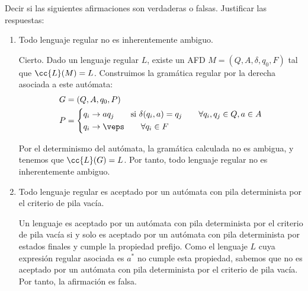 \documentclass[12pt]{article}
\begin{document}
\begin{ejercicio}[1.25 puntos]
    Decir si las siguientes afirmaciones son verdaderas o falsas. Justificar las respuestas:
    \begin{enumerate}
        \item Todo lenguaje regular no es inherentemente ambiguo.
        
        Cierto. Dado un lenguaje regular $L$, existe un AFD $M=(Q,A,\delta,q_0,F)$ tal que $\cc{L}(M)=L$. Construimos la gramática regular por la derecha asociada a este autómata:
        \begin{align*}
            G&=(Q,A,q_0,P)\\
            P&=\left\{
                \begin{aligned}
                    q_i &\rightarrow aq_j \qquad \text{si } \delta(q_i,a)=q_j\qquad \forall q_i,q_j\in Q, a\in A\\
                    q_i &\rightarrow \veps \qquad \forall q_i\in F
                \end{aligned}
            \right.
        \end{align*}

        Por el determinismo del autómata, la gramática calculada no es ambigua, y tenemos que $\cc{L}(G)=L$. Por tanto, todo lenguaje regular no es inherentemente ambiguo.

        \item Todo lenguaje regular es aceptado por un autómata con pila determinista por el criterio de pila vacía.
        
        Un lenguaje es aceptado por un autómata con pila determinista por el criterio de pila vacía si y solo es aceptado por un autómata con pila determinista por estados finales y cumple la propiedad prefijo. Como el lenguaje $L$ cuya expresión regular asociada es $a^*$ no cumple esta propiedad, sabemos que no es aceptado por un autómata con pila determinista por el criterio de pila vacía. Por tanto, la afirmación es falsa.
    \end{enumerate}
\end{ejercicio}
\end{document}
